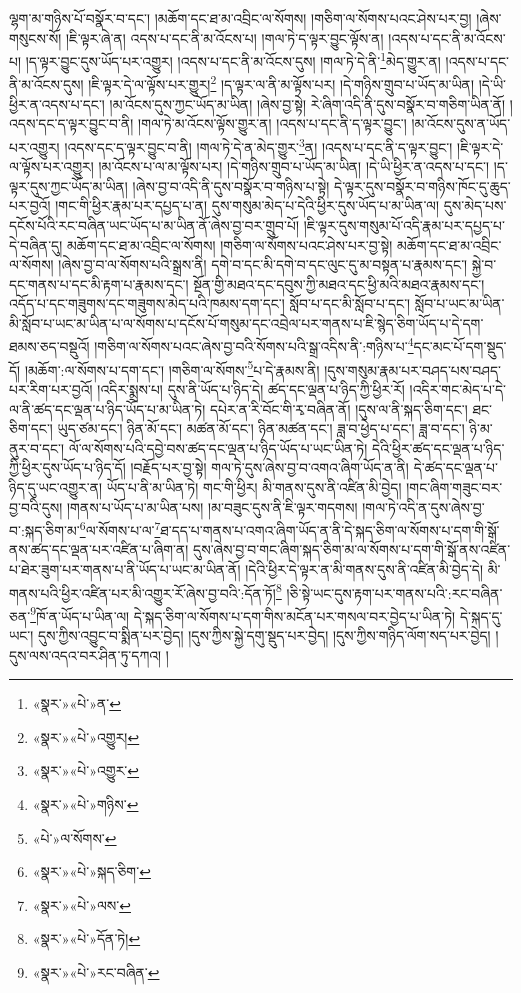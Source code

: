 ལྷག་མ་གཉིས་པོ་བསྣོར་བ་དང་། །མཆོག་དང་ཐ་མ་འབྲིང་ལ་སོགས། །གཅིག་ལ་སོགས་པའང་ཤེས་པར་བྱ། །ཞེས་གསུངས་སོ། །ཇི་ལྟར་ཞེ་ན། འདས་པ་དང་ནི་མ་འོངས་པ། །གལ་ཏེ་ད་ལྟར་བྱུང་ལྟོས་ན། །འདས་པ་དང་ནི་མ་འོངས་པ། །ད་ལྟར་བྱུང་དུས་ཡོད་པར་འགྱུར། །འདས་པ་དང་ནི་མ་འོངས་དུས། །གལ་ཏེ་དེ་ནི་\footnote{«སྣར་»«པེ་»ན་}མེད་གྱུར་ན། །འདས་པ་དང་ནི་མ་འོངས་དུས། །ཇི་ལྟར་དེ་ལ་ལྟོས་པར་གྱུར།\footnote{«སྣར་»«པེ་»འགྱུར།} །ད་ལྟར་ལ་ནི་མ་ལྟོས་པར། །དེ་གཉིས་གྲུབ་པ་ཡོད་མ་ཡིན། །དེ་ཡི་ཕྱིར་ན་འདས་པ་དང་། །མ་འོངས་དུས་ཀྱང་ཡོད་མ་ཡིན། །ཞེས་བྱ་སྟེ། རེ་ཞིག་འདི་ནི་དུས་བསྣོར་བ་གཅིག་ཡིན་ནོ། །འདས་དང་ད་ལྟར་བྱུང་བ་ནི། །གལ་ཏེ་མ་འོངས་ལྟོས་གྱུར་ན། །འདས་པ་དང་ནི་ད་ལྟར་བྱུང་། །མ་འོངས་དུས་ན་ཡོད་པར་འགྱུར། །འདས་དང་ད་ལྟར་བྱུང་བ་ནི། །གལ་ཏེ་དེ་ན་མེད་གྱུར་\footnote{«སྣར་»«པེ་»འགྱུར་}ན། །འདས་པ་དང་ནི་ད་ལྟར་བྱུང་། །ཇི་ལྟར་དེ་ལ་ལྟོས་པར་འགྱུར། །མ་འོངས་པ་ལ་མ་ལྟོས་པར། །དེ་གཉིས་གྲུབ་པ་ཡོད་མ་ཡིན། །དེ་ཡི་ཕྱིར་ན་འདས་པ་དང་། །ད་ལྟར་དུས་ཀྱང་ཡོད་མ་ཡིན། །ཞེས་བྱ་བ་འདི་ནི་དུས་བསྣོར་བ་གཉིས་པ་སྟེ། དེ་ལྟར་དུས་བསྣོར་བ་གཉིས་ཁོང་དུ་ཆུད་པར་བྱའོ། །གང་གི་ཕྱིར་རྣམ་པར་དཔྱད་པ་ན། དུས་གསུམ་མེད་པ་དེའི་ཕྱིར་དུས་ཡོད་པ་མ་ཡིན་ལ། དུས་མེད་པས་དངོས་པོའི་རང་བཞིན་ཡང་ཡོད་པ་མ་ཡིན་ནོ་ཞེས་བྱ་བར་གྲུབ་པོ། །ཇི་ལྟར་དུས་གསུམ་པོ་འདི་རྣམ་པར་དཔྱད་པ་དེ་བཞིན་དུ། མཆོག་དང་ཐ་མ་འབྲིང་ལ་སོགས། །གཅིག་ལ་སོགས་པའང་ཤེས་པར་བྱ་སྟེ། མཆོག་དང་ཐ་མ་འབྲིང་ལ་སོགས། །ཞེས་བྱ་བ་ལ་སོགས་པའི་སྒྲས་ནི། དགེ་བ་དང་མི་དགེ་བ་དང་ལུང་དུ་མ་བསྟན་པ་རྣམས་དང་། སྐྱེ་བ་དང་གནས་པ་དང་མི་རྟག་པ་རྣམས་དང་། སྔོན་གྱི་མཐའ་དང་དབུས་ཀྱི་མཐའ་དང་ཕྱི་མའི་མཐའ་རྣམས་དང་། འདོད་པ་དང་གཟུགས་དང་གཟུགས་མེད་པའི་ཁམས་དག་དང་། སློབ་པ་དང་མི་སློབ་པ་དང་། སློབ་པ་ཡང་མ་ཡིན་མི་སློབ་པ་ཡང་མ་ཡིན་པ་ལ་སོགས་པ་དངོས་པོ་གསུམ་དང་འབྲེལ་པར་གནས་པ་ཇི་སྙེད་ཅིག་ཡོད་པ་དེ་དག་ཐམས་ཅད་བསྡུའོ། །གཅིག་ལ་སོགས་པའང་ཞེས་བྱ་བའི་སོགས་པའི་སྒྲ་འདིས་ནི་:གཉིས་པ་\footnote{«སྣར་»«པེ་»གཉིས་}དང་མང་པོ་དག་སྡུད་དོ། །མཆོག་:ལ་སོགས་པ་དག་དང་། །གཅིག་ལ་སོགས་\footnote{«པེ་»ལ་སོགས་}པ་དེ་རྣམས་ནི། །དུས་གསུམ་རྣམ་པར་བཤད་པས་བཤད་པར་རིག་པར་བྱའོ། །འདིར་སྨྲས་པ། དུས་ནི་ཡོད་པ་ཉིད་དེ། ཚད་དང་ལྡན་པ་ཉིད་ཀྱི་ཕྱིར་རོ། །འདིར་གང་མེད་པ་དེ་ལ་ནི་ཚད་དང་ལྡན་པ་ཉིད་ཡོད་པ་མ་ཡིན་ཏེ། དཔེར་ན་རི་བོང་གི་རྭ་བཞིན་ནོ། །དུས་ལ་ནི་སྐད་ཅིག་དང་། ཐང་ཅིག་དང་། ཡུད་ཙམ་དང་། ཉིན་མོ་དང་། མཚན་མོ་དང་། ཉིན་མཚན་དང་། ཟླ་བ་ཕྱེད་པ་དང་། ཟླ་བ་དང་། ཉི་མ་ནུར་བ་དང་། ལོ་ལ་སོགས་པའི་དབྱེ་བས་ཚད་དང་ལྡན་པ་ཉིད་ཡོད་པ་ཡང་ཡིན་ཏེ། དེའི་ཕྱིར་ཚད་དང་ལྡན་པ་ཉིད་ཀྱི་ཕྱིར་དུས་ཡོད་པ་ཉིད་དོ། །བརྗོད་པར་བྱ་སྟེ། གལ་ཏེ་དུས་ཞེས་བྱ་བ་འགའ་ཞིག་ཡོད་ན་ནི། དེ་ཚད་དང་ལྡན་པ་ཉིད་དུ་ཡང་འགྱུར་ན། ཡོད་པ་ནི་མ་ཡིན་ཏེ། གང་གི་ཕྱིར། མི་གནས་དུས་ནི་འཛིན་མི་བྱེད། །གང་ཞིག་གཟུང་བར་བྱ་བའི་དུས། །གནས་པ་ཡོད་པ་མ་ཡིན་པས། །མ་བཟུང་དུས་ནི་ཇི་ལྟར་གདགས། །གལ་ཏེ་འདི་ན་དུས་ཞེས་བྱ་བ་:སྐད་ཅིག་མ་\footnote{«སྣར་»«པེ་»སྐད་ཅིག་}ལ་སོགས་པ་ལ་\footnote{«སྣར་»«པེ་»ལས་}ཐ་དད་པ་གནས་པ་འགའ་ཞིག་ཡོད་ན་ནི་དེ་སྐད་ཅིག་ལ་སོགས་པ་དག་གི་སྒོ་ནས་ཚད་དང་ལྡན་པར་འཛིན་པ་ཞིག་ན། དུས་ཞེས་བྱ་བ་གང་ཞིག་སྐད་ཅིག་མ་ལ་སོགས་པ་དག་གི་སྒོ་ནས་འཛིན་པ་ཐེར་ཟུག་པར་གནས་པ་ནི་ཡོད་པ་ཡང་མ་ཡིན་ནོ། །དེའི་ཕྱིར་དེ་ལྟར་ན་མི་གནས་དུས་ནི་འཛིན་མི་བྱེད་དེ། མི་གནས་པའི་ཕྱིར་འཛིན་པར་མི་འགྱུར་རོ་ཞེས་བྱ་བའི་:དོན་ཏོ།\footnote{«སྣར་»«པེ་»དོན་ཏེ།} །ཅི་སྟེ་ཡང་དུས་རྟག་པར་གནས་པའི་:རང་བཞིན་ཅན་\footnote{«སྣར་»«པེ་»རང་བཞིན་}ཁོ་ན་ཡོད་པ་ཡིན་ལ། དེ་སྐད་ཅིག་ལ་སོགས་པ་དག་གིས་མངོན་པར་གསལ་བར་བྱེད་པ་ཡིན་ཏེ། དེ་སྐད་དུ་ཡང་། དུས་ཀྱིས་འབྱུང་བ་སྨིན་པར་བྱེད། །དུས་ཀྱིས་སྐྱེ་དགུ་སྡུད་པར་བྱེད། །དུས་ཀྱིས་གཉིད་ལོག་སད་པར་བྱེད། །དུས་ལས་འདའ་བར་ཤིན་ཏུ་དཀའ། །
